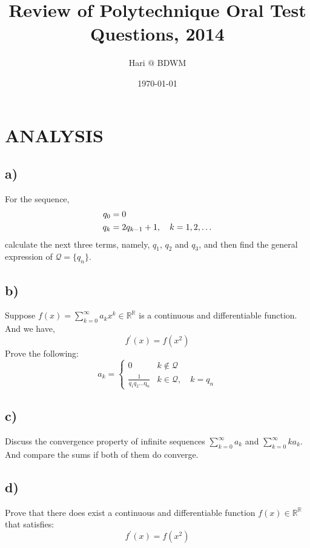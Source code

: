 \documentclass{article}
\begin{document}
\title{Review of Polytechnique Oral Test Questions, 2014}   
\author{{\normalsize Hari $@$ BDWM}}
\date{\today}

\maketitle

\def \Pr{{\rm Pr}}
\baselineskip 0.6cm

\section{ANALYSIS}
\subsection*{a)}
For the sequence,
\begin{align} \notag
  q_0 &= 0\\
  q_k &= 2q_{k-1}+1, \quad k=1,2,\dots
\end{align}
calculate the next three terms, namely, $q_1$, $q_2$ and $q_3$, and then find the general expression of $\mathcal{Q} = \{q_n\}$.

\subsection*{b)}
Suppose $f(x) = \sum _{k=0}^{\infty } a_{k}x^{k} \in \mathbb{R}^{\mathbb{R}}$ is a continuous and differentiable function. And we have,
\begin{equation}
  f^{'}(x) = f(x^2)
\end{equation}
Prove the following:
\begin{equation}
a_k=\begin{cases}
 0 & k\notin \mathcal{Q} \\
 \frac{1}{q_1q_2\text{$\ldots $q}_n} & k\in\mathcal{Q},\quad k=q_n
\end{cases}
\end{equation}
\subsection*{c)}
Discuss the convergence property of infinite sequences $\sum _{k=0}^{\infty} a_k$ and $\sum _{k=0}^{\infty} ka_k$. And compare the sums if both of them do converge.
\subsection*{d)}
Prove that there does exist a continuous and differentiable function $f(x)\in \mathbb{R}^{\mathbb{R}}$ that satisfies:
\begin{equation}
  f^{'}(x) = f(x^2)
\end{equation}
\newpage
\end{document}
